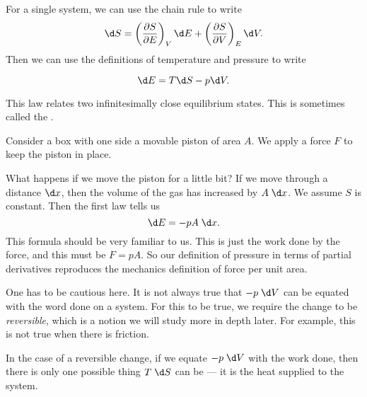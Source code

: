 \documentclass[a4paper]{article}
\begin{document}
For a single system, we can use the chain rule to write
\[
  \d S = \left(\frac{\partial S}{\partial E}\right)_V \d E + \left(\frac{\partial S}{\partial V}\right)_E \d V.
\]
Then we can use the definitions of temperature and pressure to write
\begin{prop}
  \[
    \d E = T \d S - p \d V.
  \]
\end{prop}
This law relates two infinitesimally close equilibrium states. This is sometimes called the .

\begin{eg}
  Consider a box with one side a movable piston of area $A$. We apply a force $F$ to keep the piston in place.
  \begin{center}
  \end{center}
  What happens if we move the piston for a little bit? If we move through a distance $\d x$, then the volume of the gas has increased by $A \;\d x$. We assume $S$ is constant. Then the first law tells us
  \[
    \d E = -pA \;\d x.
  \]
  This formula should be very familiar to us. This is just the work done by the force, and this must be $F = pA$. So our definition of pressure in terms of partial derivatives reproduces the mechanics definition of force per unit area.
\end{eg}

One has to be cautious here. It is not always true that $-p \;\d V$ can be equated with the word done on a system. For this to be true, we require the change to be \emph{reversible}, which is a notion we will study more in depth later. For example, this is not true when there is friction.

In the case of a reversible change, if we equate $-p \;\d V$ with the work done, then there is only one possible thing $T \;\d S$ can be --- it is the heat supplied to the system.
\end{document}

